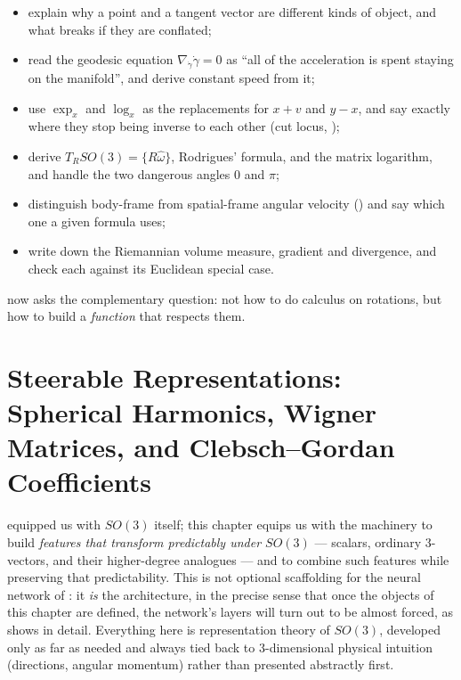 \documentclass[11pt,a4paper]{report}
\theoremstyle{definition}
\theoremstyle{remark}
\begin{document}
\begin{itemize}[nosep]
\item explain why a point and a tangent vector are different kinds of object, and what breaks if they are conflated;
\item read the geodesic equation $\nabla_{\dot\gamma}\dot\gamma=0$ as ``all of the acceleration is spent staying on the manifold'', and derive constant speed from it;
\item use $\exp_x$ and $\log_x$ as the replacements for $x+v$ and $y-x$, and say exactly where they stop being inverse to each other (cut locus, );
\item derive $T_RSO(3)=\{R\widehat\omega\}$, Rodrigues' formula, and the matrix logarithm, and handle the two dangerous angles $0$ and $\pi$;
\item distinguish body-frame from spatial-frame angular velocity () and say which one a given formula uses;
\item write down the Riemannian volume measure, gradient and divergence, and check each against its Euclidean special case.
\end{itemize}

 now asks the complementary question: not how to do calculus on rotations, but how to build a \emph{function} that respects them.

\clearpage

\chapter{Steerable Representations: Spherical Harmonics, Wigner Matrices, and Clebsch--Gordan Coefficients}
\label{chap:steerable}

 equipped us with $SO(3)$ itself; this chapter equips us
with the machinery to build \emph{features that transform predictably under
$SO(3)$} --- scalars, ordinary $3$-vectors, and their higher-degree
analogues --- and to combine such features while preserving that
predictability. This is not optional scaffolding for the neural network of
: it \emph{is} the architecture, in the precise sense
that once the objects of this chapter are defined, the network's layers
will turn out to be almost forced, as  shows in
detail. Everything here is representation theory of $SO(3)$, developed only
as far as needed and always tied back to $3$-dimensional physical intuition
(directions, angular momentum) rather than presented abstractly first.
\end{document}
